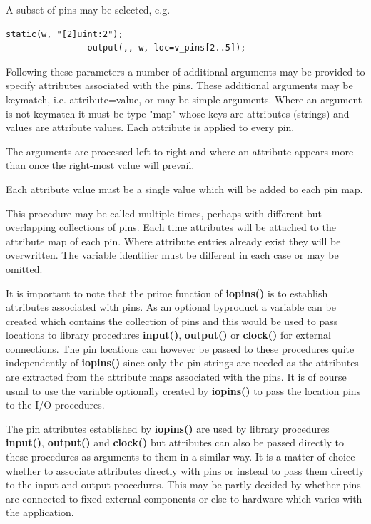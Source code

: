             A subset of pins may be selected, e.g.
            \begin{lstlisting}[gobble=12, language=threepl]
                static(w, "[2]uint:2");
                output(,, w, loc=v_pins[2..5]);
            \end{lstlisting}           

            Following these parameters a number of additional arguments may be
            provided to specify attributes associated with the pins. These
            additional arguments may be keymatch, i.e. attribute=value, or may be
            simple arguments. Where an argument is not keymatch it must be type
            "map" whose keys are attributes (strings) and values are attribute
            values. Each attribute is applied to every pin.

            The arguments are processed left to right and where an attribute
            appears more than once the right-most value will prevail.

            Each attribute value must be a single value which will be added
            to each pin map.
            
            This procedure may be called multiple times, perhaps with different
            but overlapping collections of pins. Each time attributes will be
            attached to the attribute map of each pin. Where attribute entries
            already exist they will be overwritten. The variable identifier must
            be different in each case or may be omitted.
            
            It is important to note that the prime function of {\bf iopins()} is to
            establish attributes associated with pins. As an optional byproduct a
            variable can be created which contains the collection of pins and this
            would be used to pass locations to library procedures {\bf input()},
            {\bf output()} or {\bf clock()} for external connections. The pin
            locations can however be passed to these procedures quite independently
            of {\bf iopins()} since only the pin strings are needed as the
            attributes are extracted from the attribute maps associated with the
            pins. It is of course usual to use the variable optionally created by
            {\bf iopins()} to pass the location pins to the I/O procedures.

            The pin attributes established by {\bf iopins()} are used by library
            procedures {\bf input()}, {\bf output()} and {\bf clock()} but
            attributes can also be passed directly to these procedures as arguments
            to them in a similar way. It is a matter of choice whether to associate
            attributes directly with pins or instead to pass them directly to the
            input and output procedures. This may be partly decided by whether pins
            are connected to fixed external components or else to hardware which
            varies with the application.

